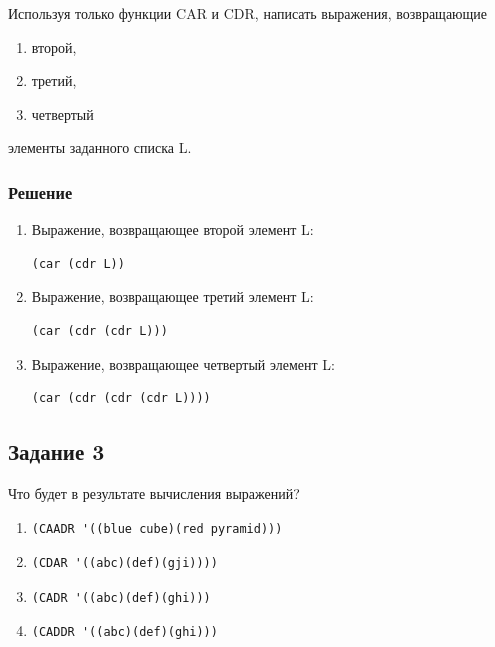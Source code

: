 \documentclass[a4paper,oneside,14pt]{extarticle}
\begin{document}
Используя только функции CAR и CDR, написать выражения, возвращающие
\begin{enumerate}
    \item второй,
    \item третий,
    \item четвертый
\end{enumerate}
элементы заданного списка L.

\subsubsection*{Решение}

\begin{enumerate}
    \item Выражение, возвращающее второй элемент L:
        \begin{lstlisting}[label={lst:}]
(car (cdr L))
        \end{lstlisting}
    \item Выражение, возвращающее третий элемент L:
        \begin{lstlisting}[label={lst:}]
(car (cdr (cdr L)))
        \end{lstlisting}
    \item Выражение, возвращающее четвертый элемент L:
        \begin{lstlisting}[label={lst:}]
(car (cdr (cdr (cdr L))))
        \end{lstlisting}
\end{enumerate}

\newpage
\subsection{Задание 3}

Что будет в результате вычисления выражений?

\begin{enumerate}
    \item \begin{lstlisting}[label={lst:}]
(CAADR '((blue cube)(red pyramid)))
        \end{lstlisting}

    \item \begin{lstlisting}[label={lst:}]
(CDAR '((abc)(def)(gji))))
        \end{lstlisting}

    \item \begin{lstlisting}[label={lst:}]
(CADR '((abc)(def)(ghi)))
        \end{lstlisting}

    \item \begin{lstlisting}[label={lst:}]
(CADDR '((abc)(def)(ghi)))
        \end{lstlisting}
\end{enumerate}
\end{document}
